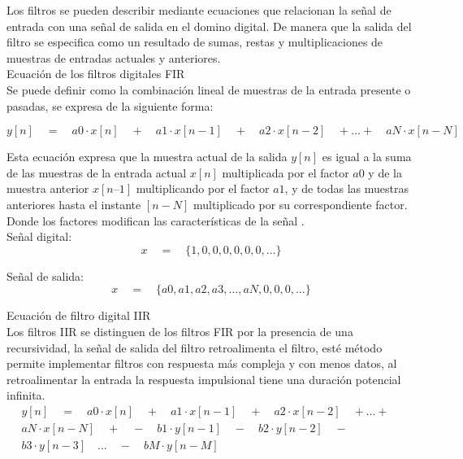 Los filtros se pueden describir mediante ecuaciones que relacionan la señal de entrada con una señal de salida en el domino digital. De manera que la salida del filtro se especifica como un resultado de sumas, restas y multiplicaciones de muestras de entradas actuales y anteriores. \\

Ecuación de los filtros digitales FIR \\

Se puede definir como la combinación lineal de muestras de la entrada presente o pasadas, se expresa de la siguiente forma:

\begin{equation}
	y[n] \quad = \quad a0 \cdot x[n] \quad + \quad a1 \cdot x[n - 1] \quad + \quad a2 \cdot x[n - 2] \quad + \ldots + \quad aN \cdot x[n - N]
\end{equation}

Esta ecuación expresa que la muestra actual de la salida $y[n]$ es igual a la suma de las muestras de la entrada actual $x[n]$ multiplicada por el factor $a0$ y de la muestra anterior $x[n – 1]$ multiplicando por el factor $a1$, y de todas las muestras anteriores hasta el instante $[n - N]$ multiplicado por su correspondiente factor. Donde los factores modifican las características de la señal \cite{cuarentayocho}. \\

Señal digital: \\

\begin{equation}
	x \quad = \quad \{1,0,0,0,0,0,0,\ldots\}
\end{equation}

Señal de salida: \\

\begin{equation}
x \quad = \quad \{a0,a1,a2,a3,\ldots,aN,0,0,0,\ldots\}
\end{equation}

Ecuación de filtro digital IIR \\

Los filtros IIR se distinguen de los filtros FIR por la presencia de una recursividad, la señal de salida del filtro retroalimenta el filtro, esté método permite implementar filtros con respuesta más compleja y con menos datos, al retroalimentar la entrada la respuesta impulsional tiene una duración potencial infinita. \\

\begin{equation*}
	\begin{split}
	y[n] \quad = \quad a0 \cdot x[n] \quad + \quad a1 \cdot x[n - 1] \quad + \quad a2 \cdot x[n - 2] \quad + \ldots + \quad \\ aN \cdot x[n - N] \quad + \quad - \quad b1 \cdot y[n-1] \quad - \quad b2 \cdot y[n-2] \quad - \quad \\ b3 \cdot y[n-3]  \quad \ldots \quad - \quad bM \cdot y[n-M]
	\end{split}		
\end{equation*}

